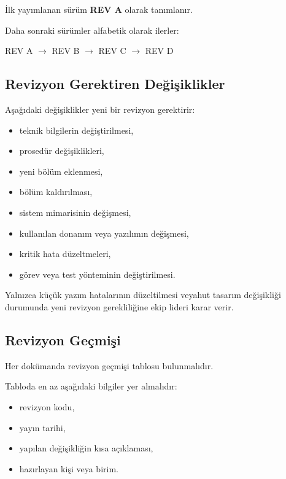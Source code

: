 \documentclass[11pt,a4paper]{article}
\begin{document}
İlk yayımlanan sürüm \textbf{REV A} olarak tanımlanır.

Daha sonraki sürümler alfabetik olarak ilerler:

\begin{center}

REV A $\rightarrow$ REV B $\rightarrow$ REV C $\rightarrow$ REV D

\end{center}

\subsection{Revizyon Gerektiren Değişiklikler}

Aşağıdaki değişiklikler yeni bir revizyon gerektirir:

\begin{itemize}
    \item teknik bilgilerin değiştirilmesi,
    \item prosedür değişiklikleri,
    \item yeni bölüm eklenmesi,
    \item bölüm kaldırılması,
    \item sistem mimarisinin değişmesi,
    \item kullanılan donanım veya yazılımın değişmesi,
    \item kritik hata düzeltmeleri,
    \item görev veya test yönteminin değiştirilmesi.
\end{itemize}

Yalnızca küçük yazım hatalarının düzeltilmesi veyahut tasarım değişikliği durumunda yeni revizyon
gerekliliğine ekip lideri karar verir.

\subsection{Revizyon Geçmişi}

Her dokümanda revizyon geçmişi tablosu bulunmalıdır.

Tabloda en az aşağıdaki bilgiler yer almalıdır:

\begin{itemize}
    \item revizyon kodu,
    \item yayın tarihi,
    \item yapılan değişikliğin kısa açıklaması,
    \item hazırlayan kişi veya birim.
\end{itemize}
\end{document}

